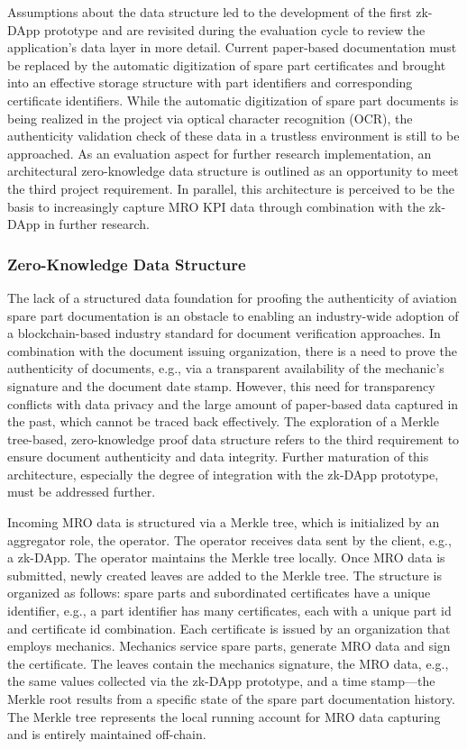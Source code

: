 Assumptions about the data structure led to the development of the first zk-DApp prototype and are revisited during the evaluation cycle to review the application's data layer in more detail. Current paper-based documentation must be replaced by the automatic digitization of spare part certificates and brought into an effective storage structure with part identifiers and corresponding certificate identifiers. While the automatic digitization of spare part documents is being realized in the project via optical character recognition (OCR), the authenticity validation check of these data in a trustless environment is still to be approached. As an evaluation aspect for further research implementation, an architectural zero-knowledge data structure is outlined as an opportunity to meet the third project requirement. In parallel, this architecture is perceived to be the basis to increasingly capture MRO KPI data through combination with the zk-DApp in further research. 

\subsubsection{Zero-Knowledge Data Structure}
The lack of a structured data foundation for proofing the authenticity of aviation spare part documentation is an obstacle to enabling an industry-wide adoption of a blockchain-based industry standard for document verification approaches. In combination with the document issuing organization, there is a need to prove the authenticity of documents, e.g., via a transparent availability of the mechanic's signature and the document date stamp. However, this need for transparency conflicts with data privacy and the large amount of paper-based data captured in the past, which cannot be traced back effectively. The exploration of a Merkle tree-based, zero-knowledge proof data structure refers to the third requirement to ensure document authenticity and data integrity. Further maturation of this architecture, especially the degree of integration with the zk-DApp prototype, must be addressed further.

Incoming MRO data is structured via a Merkle tree, which is initialized by an aggregator role, the operator. The operator receives data sent by the client, e.g., a zk-DApp. The operator maintains the Merkle tree locally. Once MRO data is submitted, newly created leaves are added to the Merkle tree. The structure is organized as follows: spare parts and subordinated certificates have a unique identifier, e.g., a part identifier has many certificates, each with a unique part id and certificate id combination. Each certificate is issued by an organization that employs mechanics. Mechanics service spare parts, generate MRO data and sign the certificate. The leaves contain the mechanics signature, the MRO data, e.g., the same values collected via the zk-DApp prototype, and a time stamp—the Merkle root results from a specific state of the spare part documentation history. The Merkle tree represents the local running account for MRO data capturing and is entirely maintained off-chain. 

